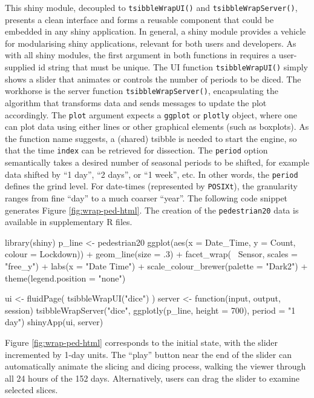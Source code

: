 This shiny module, decoupled to \texttt{tsibbleWrapUI()} and
\texttt{tsibbleWrapServer()}, presents a clean interface and forms a
reusable component that could be embedded in any shiny application. In
general, a shiny module provides a vehicle for modularising shiny
applications, relevant for both users and developers. As with all shiny
modules, the first argument in both functions in 
requires a user-supplied id string that must be unique. The UI function
\texttt{tsibbleWrapUI()} simply shows a slider that animates or controls
the number of periods to be diced. The workhorse is the server function
\texttt{tsibbleWrapServer()}, encapsulating the algorithm that
transforms data and sends messages to update the plot accordingly. The
\texttt{plot} argument expects a \texttt{ggplot} or \texttt{plotly}
object, where one can plot data using either lines or other graphical
elements (such as boxplots). As the function name suggests, a (shared)
tsibble is needed to start the engine, so that the time \texttt{index}
can be retrieved for dissection. The \texttt{period} option semantically
takes a desired number of seasonal periods to be shifted, for example
data shifted by ``1 day'', ``2 days'', or ``1 week'', etc. In other
words, the \texttt{period} defines the grind level. For date-times
(represented by \texttt{POSIXt}), the granularity ranges from fine
``day'' to a much coarser ``year''. The following code snippet generates
Figure \ref{fig:wrap-ped-html}. The creation of the
\texttt{pedestrian20} data is available in supplementary R files.

\begin{Schunk}
\begin{Sinput}
library(shiny)
p_line <- pedestrian20 %
  ggplot(aes(x = Date_Time, y = Count, colour = Lockdown)) +
  geom_line(size = .3) +
  facet_wrap(~ Sensor, scales = "free_y") +
  labs(x = "Date Time") +
  scale_colour_brewer(palette = "Dark2") +
  theme(legend.position = "none")

ui <- fluidPage(
  tsibbleWrapUI("dice")
)
server <- function(input, output, session) {
  tsibbleWrapServer("dice", ggplotly(p_line, height = 700), period = "1 day")
}
shinyApp(ui, server)
\end{Sinput}
\end{Schunk}

Figure \ref{fig:wrap-ped-html} corresponds to the initial state, with
the slider incremented by 1-day units. The ``play'' button near the end
of the slider can automatically animate the slicing and dicing process,
walking the viewer through all 24 hours of the 152 days. Alternatively,
users can drag the slider to examine selected slices.

